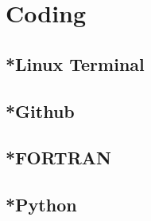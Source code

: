 \chapter{Coding}
\section{*Linux Terminal}

\section{*Github}

\section{*FORTRAN}

\section{*Python}
